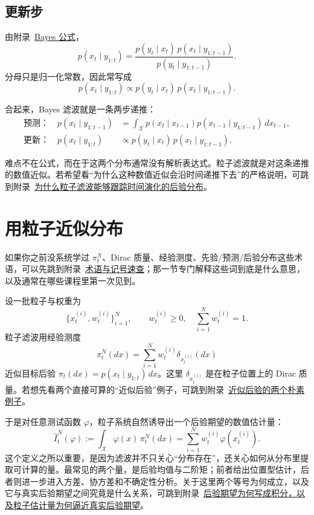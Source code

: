 \documentclass[12pt,a4paper]{ctexart}
\begin{document}
\subsection{更新步}

由附录~\hyperref[app:bayes-formula]{Bayes 公式}，
\[
p(x_t \mid y_{1:t})
= \frac{p(y_t \mid x_t)\, p(x_t \mid y_{1:t-1})}{p(y_t \mid y_{1:t-1})}.
\]
分母只是归一化常数，因此常写成
\[
p(x_t \mid y_{1:t})
\propto p(y_t \mid x_t)\, p(x_t \mid y_{1:t-1}).
\]

合起来，Bayes 滤波就是一条两步递推：
\begin{align*}
\text{预测：}\quad
p(x_t \mid y_{1:t-1})
&= \int_{\mathcal X} p(x_t \mid x_{t-1}) p(x_{t-1} \mid y_{1:t-1}) \, dx_{t-1}, \\
\text{更新：}\quad
p(x_t \mid y_{1:t})
&\propto p(y_t \mid x_t)\, p(x_t \mid y_{1:t-1}).
\end{align*}

难点不在公式，而在于这两个分布通常没有解析表达式。粒子滤波就是对这条递推的数值近似。若希望看“为什么这种数值近似会沿时间递推下去”的严格说明，可跳到附录~\hyperref[app:bayes-recursion]{为什么粒子滤波能够跟踪时间演化的后验分布}。

\section{用粒子近似分布}

如果你之前没系统学过 \(\pi_t^N\)、Dirac 质量、经验测度、先验/预测/后验分布这些术语，可以先跳到附录~\hyperref[app:notation]{术语与记号速查}；那一节专门解释这些词到底是什么意思，以及通常在哪些课程里第一次见到。

设一批粒子与权重为
\[
\{x_t^{(i)}, w_t^{(i)}\}_{i=1}^N,
\qquad
w_t^{(i)} \ge 0,\quad \sum_{i=1}^N w_t^{(i)} = 1.
\]
粒子滤波用经验测度
\[
\pi_t^N(dx)
= \sum_{i=1}^N w_t^{(i)} \delta_{x_t^{(i)}}(dx)
\]
近似目标后验 \(\pi_t(dx) = p(x_t \mid y_{1:t})\,dx\)。这里 \(\delta_{x_t^{(i)}}\) 是在粒子位置上的 Dirac 质量。若想先看两个直接可算的“近似后验”例子，可跳到附录~\hyperref[app:posterior-examples]{近似后验的两个朴素例子}。

于是对任意测试函数 \(\varphi\)，粒子系统自然诱导出一个后验期望的数值估计量：
\[
\widehat{I}_t^N(\varphi)
:=
\int_{\mathcal X} \varphi(x)\,\pi_t^N(dx)
=
\sum_{i=1}^N w_t^{(i)} \varphi(x_t^{(i)}).
\]
这个定义之所以重要，是因为滤波并不只关心“分布存在”，还关心如何从分布里提取可计算的量。最常见的两个量，是后验均值与二阶矩；前者给出位置型估计，后者则进一步进入方差、协方差和不确定性分析。关于这里两个等号为何成立，以及它与真实后验期望之间究竟是什么关系，可跳到附录~\hyperref[app:expectation-approx]{后验期望为何写成积分，以及粒子估计量为何逼近真实后验期望}。
\end{document}

